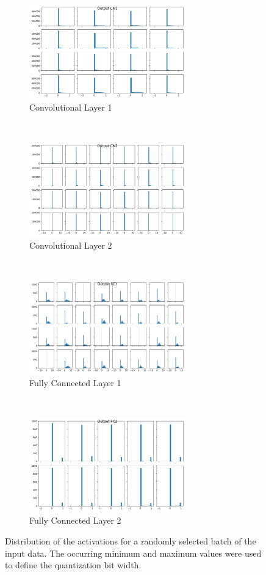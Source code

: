 \begin{figure}[htbp]
    \centering
    \begin{subfigure}[t]{0.5\textwidth}
        \centering
        \includegraphics[height=1.6in]{../../net/images/hist_ao1}
        \caption{Convolutional Layer 1}
    \end{subfigure}%
    ~ 
    \begin{subfigure}[t]{0.5\textwidth}
        \centering
         \includegraphics[height=1.6in]{../../net/images/hist_ao2}
        \caption{Convolutional Layer 2}
    \end{subfigure}%
    \\
    \begin{subfigure}[t]{0.5\textwidth}
        \centering
        \includegraphics[height=1.6in]{../../net/images/hist_ao3}
        \caption{Fully Connected Layer 1}
    \end{subfigure}%
    ~ 
    \begin{subfigure}[t]{0.5\textwidth}
        \centering
         \includegraphics[height=1.6in]{../../net/images/hist_ao4}
        \caption{Fully Connected Layer 2}
    \end{subfigure}
    \caption[Distribution of the activations for a randomly selected batch of the input data]{Distribution of the activations for a randomly selected batch of the input data. The occurring minimum and maximum values were used to define the quantization bit width.}
    \label{fig:network-activations-distributions}
\end{figure}

